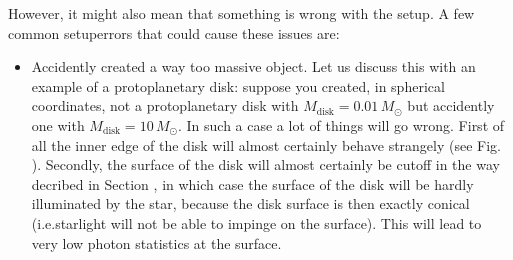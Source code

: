 \documentclass[letterpaper,10pt,english]{sphinxmanual}
\begin{document}
\begin{enumerate}
However, it might also mean that something is wrong with the setup. A few
common setup\sphinxhyphen{}errors that could cause these issues are:
\begin{itemize}
\item {} 
Accidently created a way too massive object. Let us discuss this with an
example of a protoplanetary disk: suppose you created, in spherical
coordinates, not a protoplanetary disk with
\(M_{\mathrm{disk}}=0.01\,M_{\odot}\) but accidently one with
\(M_{\mathrm{disk}}=10\,M_{\odot}\). In such a case a lot of things
will go wrong. First of all the inner edge of the disk will almost
certainly behave strangely (see Fig. {\hyperref[\detokenize{tipsandtricks:fig-innerrim-lowres}]{}}). Secondly,
the surface of the disk will almost certainly be cut\sphinxhyphen{}off in the way
decribed in Section {\hyperref[\detokenize{tipsandtricks:sec-things-going-wrong}]{}}, in which case the
surface of the disk will be hardly illuminated by the star, because the
disk surface is then exactly conical (i.e.starlight will not be able to
impinge on the surface). This will lead to very low photon statistics at
the surface.

\end{itemize}

\end{enumerate}
\end{document}

